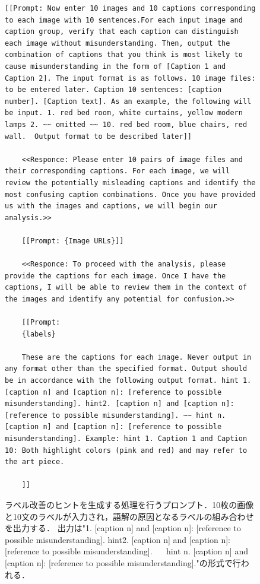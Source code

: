 \documentclass[a4paper,11pt]{jreport}
\begin{document}
\begin{figure}[h]
  \centering
  \begin{mdframed}
  \begin{lstlisting}[style=chatgptstyle]
    [[Prompt: Now enter 10 images and 10 captions corresponding to each image with 10 sentences.For each input image and caption group, verify that each caption can distinguish each image without misunderstanding. Then, output the combination of captions that you think is most likely to cause misunderstanding in the form of [Caption 1 and Caption 2]. The input format is as follows. 10 image files: to be entered later. Caption 10 sentences: [caption number]. [Caption text]. As an example, the following will be input. 1. red bed room, white curtains, yellow modern lamps 2. ~~ omitted ~~ 10. red bed room, blue chairs, red wall.  Output format to be described later]]

    <<Responce: Please enter 10 pairs of image files and their corresponding captions. For each image, we will review the potentially misleading captions and identify the most confusing caption combinations. Once you have provided us with the images and captions, we will begin our analysis.>>

    [[Prompt: {Image URLs}]]

    <<Responce: To proceed with the analysis, please provide the captions for each image. Once I have the captions, I will be able to review them in the context of the images and identify any potential for confusion.>>

    [[Prompt: 
    {labels}

    These are the captions for each image. Never output in any format other than the specified format. Output should be in accordance with the following output format. hint 1. [caption n] and [caption n]: [reference to possible misunderstanding]. hint2. [caption n] and [caption n]: [reference to possible misunderstanding]. ~~ hint n. [caption n] and [caption n]: [reference to possible misunderstanding]. Example: hint 1. Caption 1 and Caption 10: Both highlight colors (pink and red) and may refer to the art piece.
    
    ]]
  \end{lstlisting}
  \end{mdframed}
  \caption{ラベル改善のヒントを生成する処理を行うプロンプト．10枚の画像と10文のラベルが入力され，語解の原因となるラベルの組み合わせを出力する．
  出力は"1. [caption n] and [caption n]: [reference to possible misunderstanding]. hint2. [caption n] and [caption n]: [reference to possible misunderstanding]. ~~ hint n. [caption n] and [caption n]: [reference to possible misunderstanding]."の形式で行われる．}
  \label{fig:prompt_listener}
\end{figure}
\end{document}
